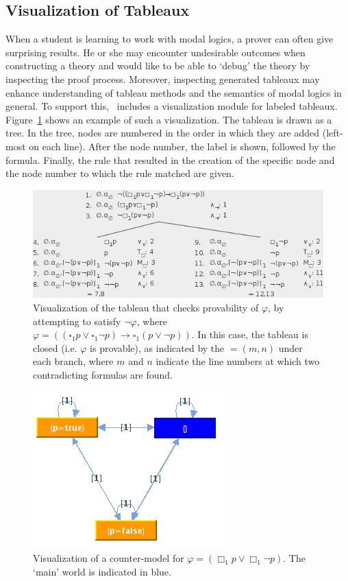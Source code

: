 \subsection{Visualization of Tableaux}

When a student is learning to work with modal logics, a prover can often give surprising
results. He or she may encounter undesirable outcomes when constructing a
theory and would like to be able to `debug' the theory by inspecting the proof
process. Moreover, inspecting generated tableaux may enhance understanding of
tableau methods and the semantics of modal logics in general.
To support this, \oops\ includes a visualization module for labeled tableaux.
Figure~\ref{fig:tableauVis} shows an example of such a visualization. 
The tableau is drawn as a tree.
In the tree, nodes are numbered  in the order in which they are added
(left-most on each line).
After the node number, the
label is shown, followed by the formula. Finally, the rule that resulted in
the creation of the specific node and the node number to which the rule
matched are given.

\begin{figure}[p]
\centering
\includegraphics[scale=.50]{images/tableauVis}
\caption{Visualization of the tableau that checks provability of $\varphi$, by
attempting to satisfy $\neg \varphi$, where
$\varphi = ((\square_1 p \vee \square_1 \neg p) \to \square_1(p \vee \neg p))$.
In this case, the tableau is closed (i.e. $\varphi$ is provable), as indicated
by the $= (m, n)$ under each branch, where $m$ and $n$ indicate the line
numbers at which two contradicting formulas are found.}
\label{fig:tableauVis}
\end{figure}

\begin{figure}[p]
\centering
\includegraphics[scale=.50]{images/modelVis}
\caption{Visualization of a counter-model for $\varphi = (\Box_1 p \vee \Box_1
\neg p)$. The `main' world is indicated in blue.}
\label{fig:modelVis}
\end{figure}


